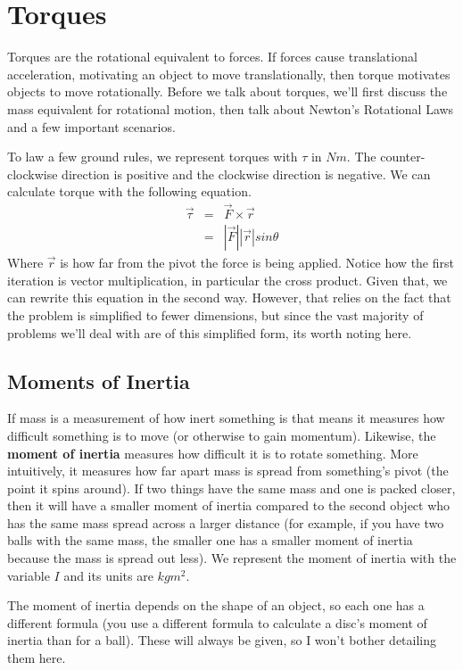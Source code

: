 \section{Torques}
Torques are the rotational equivalent to forces.
If forces cause translational acceleration, motivating an object to move translationally, then torque
motivates objects to move rotationally. Before we talk about torques, we'll first discuss the mass equivalent for rotational motion, then talk about
Newton's Rotational Laws and a few important scenarios.

To law a few ground rules, we represent torques with $\tau$ in $Nm$. The counter-clockwise direction is positive and the clockwise direction is negative.
We can calculate torque with the following equation.
\begin{eqnarray}
    \vec{\tau}  &=& \vec{F} \times \vec{r} \\
                &=& |\vec{F}| |\vec{r}| sin\theta
\end{eqnarray}
Where $\vec{r}$ is how far from the pivot the force is being applied. Notice how the first iteration is vector multiplication, in particular the cross 
product. Given that, we can rewrite this equation in the second way. However, that relies on the fact that the problem is simplified to
fewer dimensions, but since the vast majority of problems we'll deal with are of this simplified form, its worth noting here.

\subsection{Moments of Inertia}
If mass is a measurement of how inert something is that means it measures how difficult something is to move (or otherwise to gain momentum). Likewise,
the \textbf{moment of inertia} measures how difficult it is to rotate something. More intuitively, it measures how far apart mass is spread from
something's pivot (the point it spins around). If two things have the same mass and one is packed closer, then it will have a smaller moment of inertia
compared to the second object who has the same mass spread across a larger distance (for example, if you have two balls with the same mass, the smaller
one has a smaller moment of inertia because the mass is spread out less). We represent the moment of inertia with the variable $I$ and its units are
$kgm^2$.

The moment of inertia depends on the shape of an object, so each one has a different formula (you use a different formula to calculate a disc's moment
of inertia than for a ball). These will always be given, so I won't bother detailing them here.

